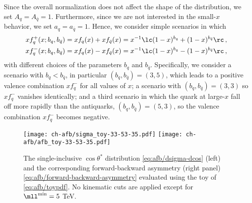 Since the overall normalization does not affect the shape
of the distribution, we set $A_q=A_{\bar{q}}=1$.
%
Furthermore, since we are not interested in the small-$x$ behavior,
we set $a_q=a_{\bar{q}}=1$. 
%
Hence, we consider simple scenarios in which 
\begin{align}\label{eq:afb/toyp}
xf_q^+(x; b_q,b_{\bar{q}}) &= xf_q(x)+xf_{\bar{q}}(x) = x^{-1}\lc (1-x)^{b_q} +(1-x)^{b_{\bar{q}}}  \rc  \,, \\\label{eq:afb/toym}
xf_q^-(x; b_q,b_{\bar{q}}) &= xf_q(x)-xf_{\bar{q}}(x) = x^{-1}\lc (1-x)^{b_q} -(1-x)^{b_{\bar{q}}}  \rc  \,, 
\end{align}
with different choices of the parameters  $b_q$ and $b_{\bar{q}}$.
Specifically, we consider a scenario with $b_q < b_{\bar{q}} $, in particular
$(b_q,b_{\bar{q}})=(3,5)$, which leads to a positive valence combination $xf_q^-$
for all values of $x$;  a  scenario with
$(b_q,b_{\bar{q}})=(3,3)$ so  $xf_q^-$ vanishes identically; and a third scenario
in which the quark \pdfs at large-$x$ fall off more rapidly than the antiquarks,
$(b_q,b_{\bar{q}})=(5,3)$, so the valence combination $xf_q^-$ becomes negative.

\begin{figure}[!t]
 \centering
 \texttt{[image: ch-afb/sigma\_toy-33-53-35.pdf]}
 \texttt{[image: ch-afb/afb\_toy-33-53-35.pdf]}
 \caption{The single-inclusive $\cos\theta^*$ distribution
   \cref{eq:afb/dsigma-dcos}  (left)
   and the corresponding forward-backward asymmetry
   (right panel) \cref{eq:afb/forward-backward-asymmetry} evaluated using 
    the toy \pdfs of \cref{eq:afb/toypdf}.
   No  kinematic cuts are applied except for $\mll^{\rm min}=5$ TeV.
 }    
 \label{fig:afb/sigma_toy}
\end{figure}

